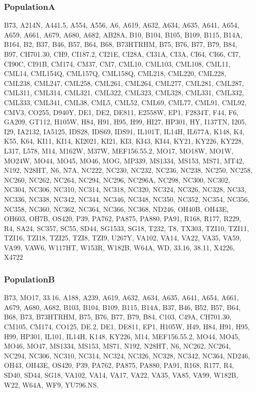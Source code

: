 \documentclass[12pt]{article}
\begin{document}
\subsubsection*{ PopulationA}
B73, A214N, A441.5, A554, A556, A6, A619, A632, A634, A635, A641, A654, A659, A661, A679, A680, A682, AB28A, B10, B104, B105, B109, B115, B14A, B164, B2, B37, B46, B57, B64, B68, B73HTRHM, B75, B76, B77, B79, B84, B97, CH701.30, CH9, CI187.2, CI21E, CI28A, CI31A, CI3A, CI64, CI66, CI7, CI90C, CI91B, CM174, CM37, CM7, CML10, CML103, CML108, CML11, CML14, CML154Q, CML157Q, CML158Q, CML218, CML220, CML228, CML238, CML247, CML258, CML261, CML264, CML277, CML281, CML287, CML311, CML314, CML321, CML322, CML323, CML328, CML331, CML332, CML333, CML341, CML38, CML5, CML52, CML69, CML77, CML91, CML92, CMV3, CO255, D940Y, DE1, DE2, DE811, E2558W, EP1, F2834T, F44, F6, GA209, GT112, H105W, H84, H91, H95, H99, HI27, HP301, HY, I137TN, I205, I29, IA2132, IA5125, IDS28, IDS69, IDS91, IL101T, IL14H, IL677A, K148, K4, K55, K64, KI11, KI14, KI2021, KI21, KI3, KI43, KI44, KY21, KY226, KY228, L317, L578, M14, M162W, M37W, MEF156.55.2, MO17, MO18W, MO1W, MO24W, MO44, MO45, MO46, MOG, MP339, MS1334, MS153, MS71, MT42, N192, N28HT, N6, N7A, NC222, NC230, NC232, NC236, NC238, NC250, NC258, NC260, NC262, NC264, NC294, NC296, NC296A, NC298, NC300, NC302, NC304, NC306, NC310, NC314, NC318, NC320, NC324, NC326, NC328, NC33, NC336, NC338, NC342, NC344, NC346, NC348, NC350, NC352, NC354, NC356, NC358, NC360, NC362, NC364, NC366, NC368, ND246, OH40B, OH43E, OH603, OH7B, OS420, P39, PA762, PA875, PA880, PA91, R168, R177, R229, R4, SA24, SC357, SC55, SD44, SG1533, SG18, T232, T8, TX303, TZI10, TZI11, TZI16, TZI18, TZI25, TZI8, TZI9, U267Y, VA102, VA14, VA22, VA35, VA59, VA99, VAW6, W117HT, W153R, W182B, W64A, WD, 33.16, 38.11, X4226, X4722

\subsubsection*{ PopulationB}
B73, MO17, 33.16, A188, A239, A619, A632, A634, A635, A641, A654, A661, A679, A680, A682, B103, B104, B109, B115, B14A, B37, B46, B52, B57, B64, B68, B73, B73HTRHM, B75, B76, B77, B79, B84, C103, C49A, CH701.30, CM105, CM174, CO125, DE.2, DE1, DE811, EP1, H105W, H49, H84, H91, H95, H99, HP301, IL101, IL14H, K148, KY226, M14, MEF156.55.2, MO44, MO45, MO46, MO47, MS1334, MS153, MS71, N192, N28HT, N6, NC262, NC264, NC294, NC306, NC310, NC314, NC324, NC326, NC328, NC342, NC364, ND246, OH43, OH43E, OS420, P39, PA762, PA875, PA880, PA91, R168, R177, R4, SD40, SD44, SG18, VA102, VA14, VA17, VA22, VA35, VA85, VA99, W182B, W22, W64A, WF9, YU796.NS.
\end{document}
